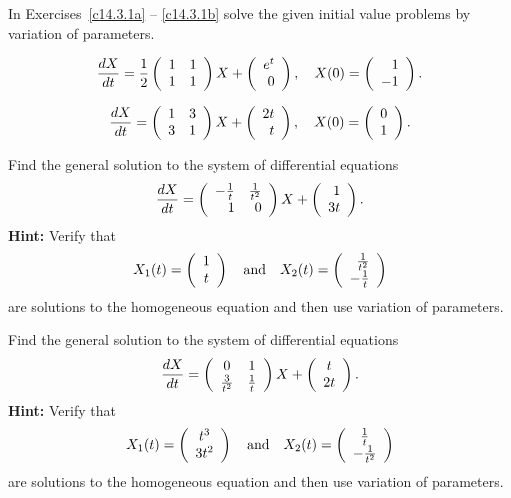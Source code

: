 \documentclass{ximera}
\begin{document}
\EXER

\TEXER

\noindent In Exercises~\ref{c14.3.1a} -- \ref{c14.3.1b} solve the given 
initial value problems by variation of parameters.

\begin{exercise}  \label{c14.3.1a}
\[
\frac{dX}{dt}=\frac{1}{2}\left(\begin{array}{rr} 1 & 1\\ 1 &1\end{array}\right) X + \left(\begin{array}{r} e^t \\ 0\end{array}\right),\quad
X(0) = \left(\begin{array}{r} 1 \\ -1\end{array}\right).
\]
\end{exercise}
\begin{exercise}  \label{c14.3.1b}
\[
\frac{dX}{dt}=\left(\begin{array}{rr} 1 & 3\\ 3 &1\end{array}\right) X + \left(\begin{array}{r} 2t \\ t\end{array}\right),\quad
X(0) = \left(\begin{array}{r} 0 \\ 1\end{array}\right).
\]
\end{exercise}

\begin{exercise}  \label{c17.3.3}
Find the general solution to the system of differential equations
\[
\frac{dX}{dt}= \left(\begin{array}{rr} -\frac{1}{t} & \frac{1}{t^2}\\ 1 &0\end{array}\right)X+\left(\begin{array}{r} 1 \\ 3t\end{array}\right).
\]
{\bf Hint:} Verify that 
\[
X_1(t) = \left(\begin{array}{c} 1 \\ t\end{array}\right) \quad\mbox{and}\quad X_2(t) = \left(\begin{array}{r} \frac{1}{t^2} \\ -\frac{1}{t}\end{array}\right)
\]
are solutions to the homogeneous equation and then use variation of parameters.
\end{exercise}

\begin{exercise}  \label{c17.3.4}
Find the general solution to the system of differential equations
\[
\frac{dX}{dt}= \left(\begin{array}{cc} 0 & 1\\ \frac{3}{t^2} &\frac{1}{t}\end{array}\right)X+\left(\begin{array}{c} t \\ 2t\end{array}\right).
\]
{\bf Hint:} Verify that 
\[
X_1(t) = \left(\begin{array}{c} t^3 \\ 3t^2\end{array}\right)\quad\mbox{and}\quad X_2(t) = \left(\begin{array}{c} \frac{1}{t} \\ -\frac{1}{t^2}\end{array}\right)
\]
are solutions to the homogeneous equation and then use variation of parameters.
\end{exercise}
\end{document}
